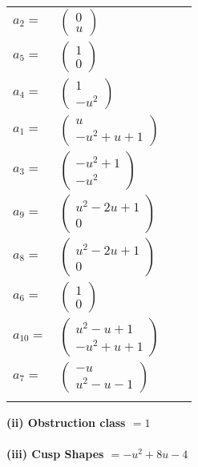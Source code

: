 \documentclass[1p]{elsarticle_modified}
\theoremstyle{definition}
\begin{document}
\begin{tabular}{m{7pt} m{180pt} m{7pt} m{180pt} }
\flushright $a_{2}=$&$\begin{pmatrix}0\\u\end{pmatrix}$ \\
\flushright $a_{5}=$&$\begin{pmatrix}1\\0\end{pmatrix}$ \\
\flushright $a_{4}=$&$\begin{pmatrix}1\\- u^2\end{pmatrix}$ \\
\flushright $a_{1}=$&$\begin{pmatrix}u\\- u^2+u+1\end{pmatrix}$ \\
\flushright $a_{3}=$&$\begin{pmatrix}- u^2+1\\- u^2\end{pmatrix}$ \\
\flushright $a_{9}=$&$\begin{pmatrix}u^2-2 u+1\\0\end{pmatrix}$ \\
\flushright $a_{8}=$&$\begin{pmatrix}u^2-2 u+1\\0\end{pmatrix}$ \\
\flushright $a_{6}=$&$\begin{pmatrix}1\\0\end{pmatrix}$ \\
\flushright $a_{10}=$&$\begin{pmatrix}u^2- u+1\\- u^2+u+1\end{pmatrix}$ \\
\flushright $a_{7}=$&$\begin{pmatrix}- u\\u^2- u-1\end{pmatrix}$\\&\end{tabular}
\flushleft \textbf{(ii) Obstruction class $= 1$}\\~\\
\flushleft \textbf{(iii) Cusp Shapes $= - u^2+8 u-4$}\\~\\
\end{document}

